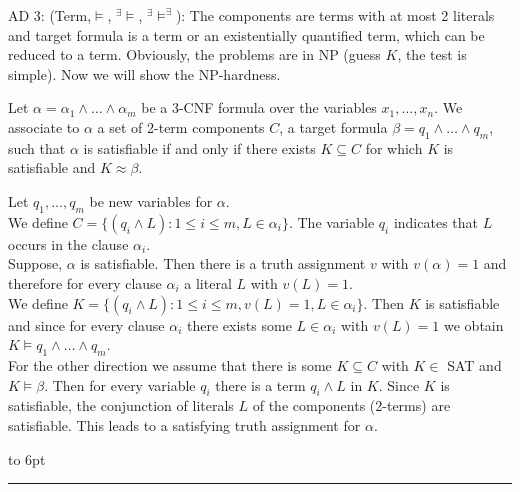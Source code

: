 \documentclass[12pt]{article}
\newcommand{\AM}{\mbox{$^\exists\!\!\models$}}
\newcommand{\AMB}{\mbox{$^\exists\!\!\models^\exists$}}
\newenvironment{proof}{\parindent=0pt{\bf Proof: }}{
   \hspace*{\fill}\hbox to 6pt{\leaders\hrule width 6pt height 6pt\hfill}\par}
\begin{document}
\begin{proof}
AD 3:  (Term,$\models$, \AM, \AMB): The components are terms with at most 2 literals and target formula is a term or an existentially quantified term, which can be reduced to a term. Obviously, the problems are in NP (guess $K$, the test
is simple). Now we will show the NP-hardness.

Let $\alpha = \alpha_1 \wedge \ldots \wedge \alpha_m$ be a 3-CNF formula over the variables $x_1, \ldots, x_n$. We associate
to $\alpha$ a set of 2-term components $C$, a target formula $\beta= q_1 \wedge \ldots \wedge q_m$, such that $\alpha$ is satisfiable if and only if
there exists $K \subseteq C$ for which $K$ is satisfiable and $K \approx\beta$.

Let $q_1, \ldots, q_m$ be new variables for $\alpha$.\\
We define $C=\{(q_i \wedge L) : 1 \leq i \leq m, L \in \alpha_i\}$. The variable $q_i$ indicates that $L$ occurs in the clause $\alpha_i$.\\
Suppose, $\alpha$ is satisfiable. Then there is a truth assignment $v$ with $v(\alpha)=1$ and therefore for every clause $\alpha_i$ a literal $L$ with $v(L)=1$.\\
We define $K = \{(q_i \wedge L) : 1 \leq i \leq m, v(L)=1, L \in \alpha_i\}$. Then $K$ is satisfiable and since
for every clause $\alpha_i$ there exists some $L \in \alpha_i$ with $v(L)=1$ we obtain $K \models q_1 \wedge \ldots \wedge q_m$.\\
For the other direction we assume that there is some $K \subseteq C$ with $K \in$ SAT and $K \models \beta$.
Then for every variable $q_i$ there is a term $q_i \wedge L$ in $K$. Since $K$ is satisfiable, the conjunction of literals $L$ of the components (2-terms) are satisfiable. This leads to a satisfying truth assignment for $\alpha$.
\end{proof}
\end{document}

